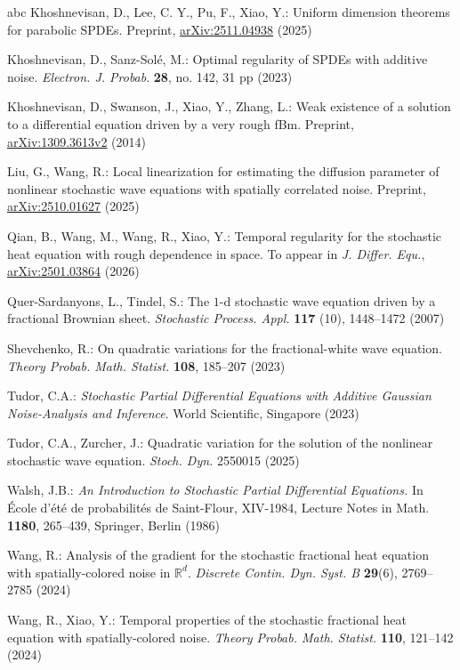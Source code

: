\documentclass[11pt,reqno]{amsart}
\numberwithin{equation}{section}
\newcommand{\1}{{\bf 1}}
\newcommand{\2}{{\bf 2}}
\begin{document}
\begin{thebibliography}{abc}
  Khoshnevisan, D., Lee, C. Y., Pu, F.,   Xiao, Y.:  Uniform dimension theorems for parabolic SPDEs. Preprint, \href{https://arxiv.org/abs/2511.04938}{arXiv:2511.04938} (2025)
  
  Khoshnevisan, D.,  Sanz-Sol\'e, M.:  Optimal regularity of SPDEs with additive noise. {\it Electron. J. Probab}. {\bf 28}, no. 142, 31 pp (2023)

 
Khoshnevisan, D., Swanson, J., Xiao, Y., Zhang, L.: Weak existence of a solution to a differential equation driven by a very rough fBm. 
Preprint, \href{https://arxiv.org/pdf/1309.3613.pdf}{arXiv:1309.3613v2} (2014)

   
 Liu, G.,   Wang, R.: Local linearization for estimating the diffusion parameter of nonlinear stochastic wave equations with spatially correlated noise. Preprint,  \href{https://arxiv.org/abs/2510.01627}{arXiv:2510.01627}  (2025)
  
Qian, B., Wang, M., Wang, R., Xiao, Y.: Temporal regularity for the stochastic heat equation with rough dependence in space. To appear in {\it J. Differ. Equ.},   \href{https://arxiv.org/abs/2501.03864}{arXiv:2501.03864} (2026) 

 
 Quer-Sardanyons,  L.,  Tindel,   S.: The $1$-d stochastic wave equation driven by a fractional Brownian sheet.
{\it Stochastic Process. Appl.} {\bf 117} (10),  1448--1472 (2007)
 
 
 
Shevchenko, R.: On quadratic variations for the fractional-white wave equation. 
\textit{Theory Probab. Math. Statist.} \textbf{108}, 185--207 (2023)

Tudor, C.A.: \textit{Stochastic Partial Differential Equations with Additive Gaussian Noise-Analysis and Inference}.  
World Scientific, Singapore (2023)

Tudor, C.A., Zurcher, J.: Quadratic variation for the solution of the nonlinear stochastic wave equation. 
\textit{Stoch. Dyn.} 2550015 (2025)
 

 
 Walsh, J.B.: {\it An Introduction to Stochastic Partial Differential Equations.}
 In  \'{E}cole d'\'{e}t\'{e} de probabilit\'{e}s de Saint-Flour, XIV-1984,
  Lecture Notes in Math. {\bf 1180}, 265--439, Springer, Berlin (1986)
  
   Wang,  R.:  Analysis of the gradient for the stochastic fractional heat equation with spatially-colored noise in $\mathbb R^d$. \textit{Discrete Contin. Dyn. Syst. B} {\bf 29}(6), 2769--2785 (2024)
 
Wang, R., Xiao, Y.: Temporal properties of the stochastic fractional heat equation with spatially-colored noise. 
\textit{Theory Probab. Math. Statist.} \textbf{110}, 121--142 (2024)
 
     \end{thebibliography}
\vskip0.8cm



    
\end{document}
